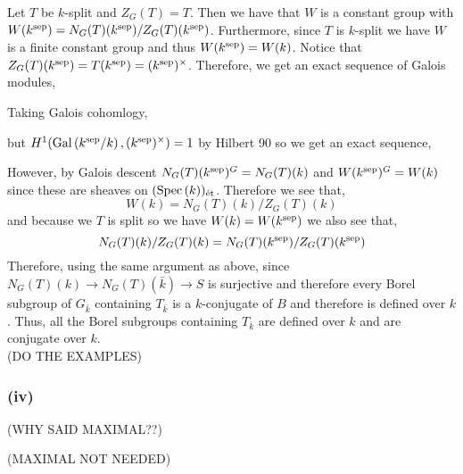 \documentclass[12pt]{article}
\begin{document}
Let $T$ be $k$-split and $Z_G(T) = T$. Then we have that $W$ is a constant group with $W(k^{\mathrm{sep}}) = N_G(T)(k^{\mathrm{sep}})/Z_G(T)(k^{\mathrm{sep}})$. Furthermore, since $T$ is $k$-split we have $W$ is a finite \etale constant group and thus $W(k^{\mathrm{sep}}) = W(k)$. Notice that $Z_G(T)(k^{\mathrm{sep}}) = T(k^{\mathrm{sep}}) = (k^{\mathrm{sep}})^\times$. Therefore, we get an exact sequence of Galois modules,
\begin{center}
\end{center}
Taking Galois cohomlogy,
\begin{center}
\end{center}
but $H^1(\mathrm{Gal}\left( k^{\mathrm{sep}}/k \right), (k^{\mathrm{sep}})^\times) = 1$ by Hilbert 90 so we get an exact sequence,
\begin{center}
\end{center}
However, by Galois descent $N_G(T)(k^{\mathrm{sep}})^G = N_G(T)(k)$ and $W(k^{\mathrm{sep}})^G = W(k)$ since these are sheaves on $(\mathrm{Spec}\left( k \right))_{\text{\'{e}t}}$. Therefore we see that,
\[ W(k) = N_G(T)(k) / Z_G(T)(k) \]
and because we $T$ is split so we have $W(k) = W(k^{\mathrm{sep}})$ we also see that,
\[ N_G(T)(k) / Z_G(T)(k) = N_G(T)(k^{\mathrm{sep}}) / Z_G(T)(k^{\mathrm{sep}}) \]
Therefore, using the same argument as above, since $N_G(T)(k) \to N_G(T)(\bar{k}) \to S$ is surjective and therefore every Borel subgroup of $G_{\bar{k}}$ containing $T_{\bar{k}}$ is a $k$-conjugate of $B$ and therefore is defined over $k$. Thus, all the Borel subgroups containing $T_{\bar{k}}$ are defined over $k$ and are conjugate over $k$.
\bigskip\\
(DO THE EXAMPLES)

\subsubsection{(iv)}

(WHY SAID MAXIMAL??)

(MAXIMAL NOT NEEDED) 
\end{document}

